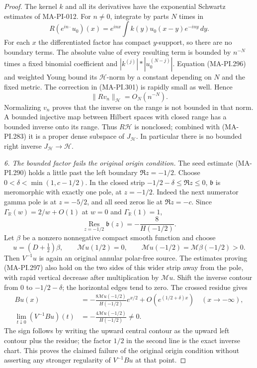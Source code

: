 \begin{proof}
The kernel \(k\) and all its derivatives have
the exponential Schwartz estimates of MA-PI-012.
For \(n\ne0\), integrate by parts \(N\) times
in
\[
 R(e^{in\cdot}u_0)(x)
       =e^{inx}\int k(y)u_0(x-y)e^{-iny}\,dy .
 \tag{MA-PI.302}
\]
For each \(x\) the differentiated factor has
compact \(y\)-support, so there are no boundary
terms.  The absolute value of every resulting
term is bounded by \(n^{-N}\) times a fixed
binomial coefficient and
\(|k^{(j)}|*|u_0^{(N-j)}|\).
Equation (MA-PI.296) and weighted Young bound
its \(\mathscr H\)-norm by a constant depending
on \(N\) and the fixed metric.  The correction
in (MA-PI.301) is rapidly small as well.  Hence
\[
             \|Rv_n\|_{\mathscr H}=O_N(n^{-N}).
 \tag{MA-PI.303}
\]
Normalizing \(v_n\) proves that the inverse on
the range is not bounded in that norm.
A bounded injective map between Hilbert spaces
with closed range has a bounded inverse onto
its range.  Thus \(R\mathscr H\) is nonclosed;
combined with (MA-PI.283) it is a proper dense
subspace of \(J_{\mathscr H}\).  In particular
there is no bounded right inverse
\(J_{\mathscr H}\to\mathscr H\).

\emph{6. The bounded factor fails the original origin condition.}
The seed estimate (MA-PI.290) holds a little
past the left boundary \(\Re z=-1/2\).
Choose \(0<\delta<\min(1,c-1/2)\).  In the
closed strip \(-1/2-\delta\le\Re z\le0\),
\(\mathfrak b\) is meromorphic with exactly
one pole, at \(z=-1/2\).  Indeed the next
numerator gamma pole is at \(z=-5/2\), and
all seed zeros lie at \(\Re z=-c\).
Since \(\Gamma_{\mathbb R}(w)=2/w+O(1)\)
at \(w=0\) and \(\Gamma_{\mathbb R}(1)=1\),
\[
           \operatorname*{Res}_{z=-1/2}
                  \mathfrak b(z)=-\frac8{H(-1/2)}.
 \tag{MA-PI.304}
\]
Let \(\beta\) be a nonzero nonnegative compact
smooth function and choose
\[
 u=(D+\tfrac12)\beta,\qquad
 \mathcal Mu(1/2)=0,\qquad
 \mathcal Mu(-1/2)=\mathcal M\beta(-1/2)>0.
 \tag{MA-PI.305}
\]
Then \(V^{-1}u\) is again an original annular
polar-free source.  The estimates proving
(MA-PI.297) also hold on the two sides of this
wider strip away from the pole, with rapid
vertical decrease after multiplication by
\(\mathcal Mu\).  Shift the inverse contour
from \(0\) to \(-1/2-\delta\); the horizontal
edges tend to zero.  The crossed residue gives
\[
 \begin{aligned}
 Bu(x)&=-\frac{8\mathcal Mu(-1/2)}{H(-1/2)}
                   e^{x/2}
            +O(e^{(1/2+\delta)x})\quad(x\to-\infty),\\
 \lim_{t\downarrow0}(V^{-1}Bu)(t)
       &=-\frac{4\mathcal Mu(-1/2)}{H(-1/2)}\ne0.
 \end{aligned}
 \tag{MA-PI.306}
\]
The sign follows by writing the upward central
contour as the upward left contour plus the
residue; the factor \(1/2\) in the second line
is the exact inverse chart.  This proves the
claimed failure of the original origin
condition without asserting any stronger
regularity of \(V^{-1}Bu\) at that point.
\end{proof}

